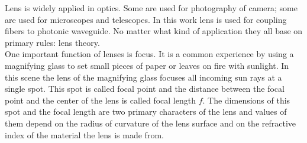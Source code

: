 Lens is widely applied in optics. Some are used for photography of camera; some are used for microscopes and telescopes.  In this work lens is used for coupling fibers to photonic waveguide. No matter what kind of application they all base on primary rules: lens theory.\\

One important function of lenses is focus. It is a common experience by using a magnifying glass to set small pieces of paper or leaves on fire with sunlight. In this scene the lens of the magnifying glass focuses all incoming sun rays at a single spot. This spot is called focal point and the distance between the focal point and the center of the lens is called focal length $f$. The dimensions of this spot and the focal length are two primary characters of the lens and values of them depend on the radius of curvature of the lens surface and on the refractive index of the material the lens is made from. \\

